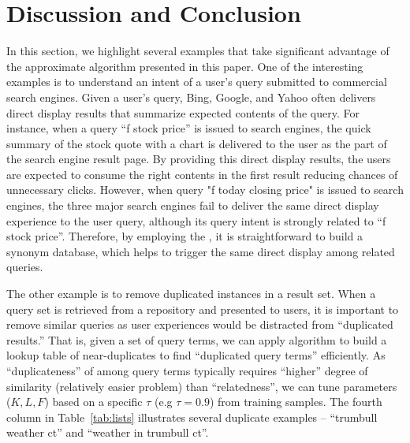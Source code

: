 \section{Discussion and Conclusion}
\label{sec:discuss}
In this section, we highlight several examples that take significant advantage of  the approximate \dflipb algorithm presented in this paper.
One of the interesting examples is to understand an intent of a user's query submitted to commercial search engines. Given a user's query,
Bing, Google, and Yahoo often delivers direct display results that summarize expected contents of the query. 
For instance, when a query ``f stock price'' is issued  to search engines, the quick summary of the stock quote with a chart is delivered 
to the user as the part of the search engine result page. By providing this direct display results, the users are expected to consume the right contents
in the first result reducing chances of unnecessary clicks. However, when query "f today closing price" is issued to search engines, the three major search engines 
fail to deliver the same direct display experience to the user query, although its query intent is strongly related to ``f stock price''. 
Therefore, by employing the \dflipb, it is straightforward to build a synonym database, which helps to trigger the same direct display among related queries.

The other example is to remove duplicated instances in a result set. 
When a query set is retrieved from a repository and presented to users, it is important to remove similar queries as user experiences would be distracted from ``duplicated results.'' 
That is, given a set of query terms, we can apply  \dflipb algorithm to build a lookup table of near-duplicates 
to find ``duplicated query terms'' efficiently. As ``duplicateness'' of among query terms typically requires ``higher'' degree of similarity (relatively easier problem) than ``relatedness'', we can tune parameters ($K, L, F$) based on a specific $\tau$ (e.g $\tau=0.9$) from training samples.  The fourth column in Table~\ref{tab:lists} illustrates several duplicate examples -- ``trumbull weather ct'' and ``weather in trumbull ct''.


